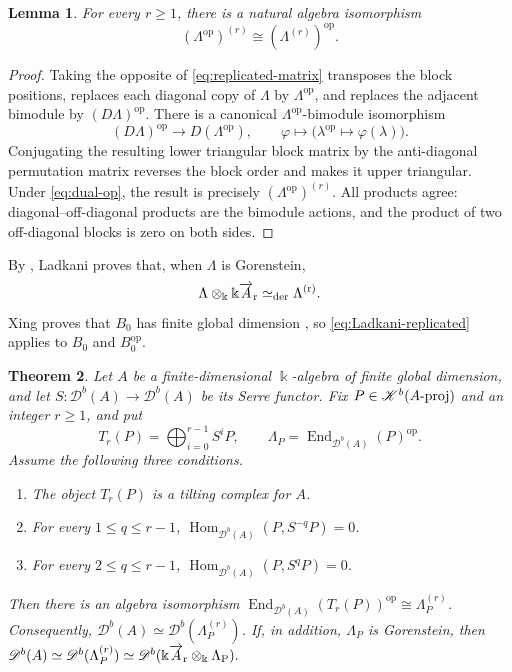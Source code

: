 \documentclass[12pt,a4paper,english,reqno]{amsart}
\theoremstyle{plain}
\newtheorem{theorem}{Theorem}[section]
\newtheorem{lemma}[theorem]{Lemma}
\theoremstyle{definition}
\newcommand{\kk}{\Bbbk}
\newcommand{\Hom}{\operatorname{Hom}}
\newcommand{\End}{\operatorname{End}}
\newcommand{\op}{\mathrm{op}}
\newcommand{\Db}[1]{{\mathscr D}^b(#1)}
\newcommand{\ovr}{\rm \overrightarrow}
\newcommand{\pmodcat}[1]{#1\mbox{{\rm -proj}}}
\newcommand{\Kb}[1]{{\mathscr K}^b(#1)}
\begin{document}
\begin{lemma}
\label{lem:replicated-op}
For every $r\geq1$, there is a natural algebra isomorphism
\begin{equation}
 (\Lambda^{\op})^{(r)}
 \cong(\Lambda^{(r)})^{\op}.
\label{eq:replicated-op}
\end{equation}
\end{lemma}

\begin{proof}
Taking the opposite of \eqref{eq:replicated-matrix} transposes the block
positions, replaces each diagonal copy of $\Lambda$ by $\Lambda^{\op}$,
and replaces the adjacent bimodule by $(D\Lambda)^{\op}$.  There is a
canonical $\Lambda^{\op}$-bimodule isomorphism
\begin{equation}
 (D\Lambda)^{\op}\longrightarrow D(\Lambda^{\op}),
 \qquad \varphi\longmapsto\bigl(\lambda^{\op}\mapsto\varphi(\lambda)\bigr).
\label{eq:dual-op}
\end{equation}
Conjugating the resulting lower triangular block matrix by the
anti-diagonal permutation matrix reverses the block order and makes it
upper triangular.  Under \eqref{eq:dual-op}, the result is precisely
$(\Lambda^{\op})^{(r)}$.  All products agree: diagonal--off-diagonal
products are the bimodule actions, and the product of two off-diagonal
blocks is zero on both sides.
\end{proof}

By \cite[Corollary~1.3]{Ladkani}, Ladkani proves that, when $\Lambda$ is Gorenstein,
\begin{equation}
 \Lambda\otimes_{\kk}\kk\ovr A_r
 \simeq_{\mathrm{der}}\Lambda^{(r)}.
\label{eq:Ladkani-replicated}
\end{equation}
Xing proves that $B_0$ has finite global
dimension \cite[Proposition~4.34]{Xing}, so
\eqref{eq:Ladkani-replicated} applies to $B_0$ and $B_0^{\op}$.

\begin{theorem}
\label{thm:serre-orbit-replication}
Let $A$ be a finite-dimensional $\kk$-algebra of finite global
dimension, and let $S\colon\Db{A}\longrightarrow\Db{A}$
be its Serre functor.  Fix $P\in \Kb{\pmodcat{A}}$ and
an integer $r\geq1$, and put
\[
 T_r(P)=\bigoplus_{i=0}^{r-1}S^iP,
 \qquad
 \Lambda_P=\End_{\Db{A}}(P)^{\op}.
\]
Assume the following three conditions.
\begin{enumerate}
\item The object $T_r(P)$ is a tilting complex for $A$.
\item For every $1\leq q\leq r-1$, $\Hom_{\Db{A}}(P,S^{-q}P)=0$.
\item For every $2\leq q\leq r-1$, $\Hom_{\Db{A}}(P,S^qP)=0$.
\end{enumerate}
Then there is an algebra isomorphism
$\End_{\Db{A}}(T_r(P))^{\op}
 \cong \Lambda_P^{(r)}$.
Consequently, $\Db{A}\simeq\Db{\Lambda_P^{(r)}}$.
If, in addition, $\Lambda_P$ is Gorenstein, then
$\Db{A}
 \simeq\Db{\Lambda_P^{(r)}}
 \simeq
 \Db{\kk\ovr A_r\otimes_{\kk}\Lambda_P}.$
\end{theorem}
\end{document}
